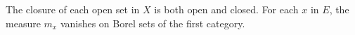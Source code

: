 The closure of each open set in $X$ is both open and closed. For each $x$ in $E$, the measure $m_x$ vanishes on Borel sets of the first category.
